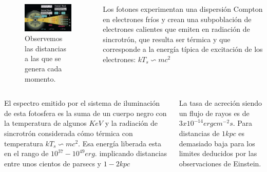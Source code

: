\documentclass{beamer}
\begin{document}
\begin{frame}
	\begin{columns}
	
		\begin{column}{5cm}
			\begin{figure}
				\centering
				\includegraphics[scale=0.2]{figure1.jpg}
				\caption{Observemos las distancias a las que se
				genera cada momento.}
			\end{figure}
		\end{column}
		
		
		\begin{column}{5cm}
		Los fotones experimentan una dispersi\'on Compton en electrones fr\'ios y crean una subpoblaci\'on de electrones
		calientes que emiten en radiaci\'on de sincrotr\'on, que resulta ser t\'ermica y que corresponde a la energ\'ia t\'ipica
		de excitaci\'on de los electrones: $kT_{s} \backsim mc^{2}$
		\end{column}	
	\end{columns}
\end{frame}




\begin{frame}
	\begin{columns}
	
		\begin{column}{5cm}
		El espectro emitido por el sistema de iluminaci\'on de esta fotosfera
		es la suma de un cuerpo negro con la temperatura de algunos $KeV$ y la
		radiaci\'on de sincrotr\'on considerada c\'omo t\'ermica con temperatura
		$kT_{s} \backsim mc^{2}$. Esa energ\'ia liberada esta en el rango de 
		$10^{37} - 10^{49} erg.$ implicando distancias entre unos cientos de parsecs
		y $1-2 kpc$
		\end{column}
		
		
		\begin{column}{5cm}
		La tasa de acreci\'on siendo un flujo de rayos es de  $3 x 10^{-14}erg cm^{-2}s $.
		Para distancias de $1 kpc$ es demasiado baja para los limites deducidos por las
		observaciones de Einstein.
		
		\end{column}	
	\end{columns}
\end{frame}
\end{document}
